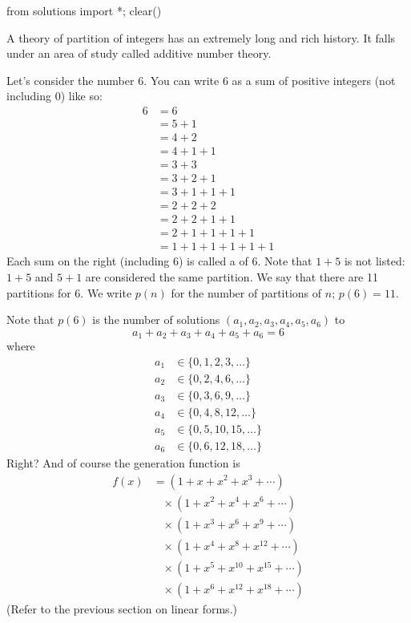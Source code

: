 \begin{python0}
from solutions import *; clear() 
\end{python0}

A theory of partition of integers has an extremely long and rich history.
It falls under an area of study called additive number theory.

Let's consider the number 6.
You can write 6 as a sum of positive integers (not including 0) like so:
\begin{align*}
6
&= 6 \\
&= 5 + 1\\
&= 4 + 2 \\
&= 4 + 1 + 1 \\
&= 3 + 3 \\
&= 3 + 2 + 1 \\
&= 3 + 1 + 1 + 1 \\
&= 2 + 2 + 2 \\
&= 2 + 2 + 1 + 1 \\
&= 2 + 1 + 1 + 1 + 1 \\
&= 1 + 1 + 1 + 1 + 1 + 1 
\end{align*}
Each sum on the right (including $6$) is called a  of $6$.
Note that $1 + 5$ is not listed: $1 + 5$ and $5 + 1$ are considered
the same partition.
We say that there are 11 partitions for $6$.
We write $p(n)$ for the number of partitions of $n$;
$p(6) = 11$.






\newpage
Note that $p(6)$ is the number of solutions $(a_1, a_2, a_3, a_4, a_5, a_6)$ to
\[
a_1 +  a_2 +  a_3 + a_4 + a_5 + a_6 = 6
\]
where 
\begin{align*}
a_1 &\in \{0, 1, 2, 3, \ldots\} \\
a_2 &\in \{0, 2, 4, 6, \ldots\} \\
a_3 &\in \{0, 3, 6, 9, \ldots\} \\
a_4 &\in \{0, 4, 8, 12, \ldots\} \\
a_5 &\in \{0, 5, 10, 15, \ldots\} \\
a_6 &\in \{0, 6, 12, 18, \ldots\} 
\end{align*}
Right? 
And of course the generation function is
\begin{align*}
f(x) 
&= (1 + x + x^2 + x^3 + \cdots ) \\
& \,\,\,\,\, \times (1 + x^2 + x^4 + x^6 + \cdots ) \\
& \,\,\,\,\, \times (1 + x^3 + x^6 + x^9 + \cdots ) \\
& \,\,\,\,\, \times (1 + x^4 + x^8 + x^{12} + \cdots ) \\
& \,\,\,\,\, \times (1 + x^5 + x^{10} + x^{15} + \cdots ) \\
& \,\,\,\,\, \times (1 + x^6 + x^{12} + x^{18} + \cdots ) 
\end{align*}
(Refer to the previous section on linear forms.)

